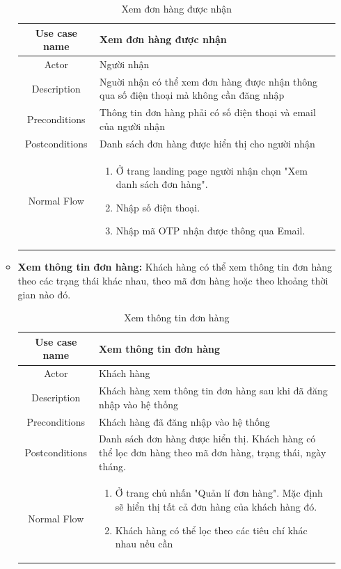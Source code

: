 \begin{itemize}
\begin{itemize}
			
			\begin{table}[H]
				\centering\begin{tabular}{|c|m{25em}|}
					\hline 
					Use case name & Xem đơn hàng được nhận\\ 
					\hline 
					Actor & Người nhận \\ 
					\hline
					Description & Nguời nhận có thể xem đơn hàng được nhận thông qua số điện thoại mà không cần đăng nhập \\
					\hline 
					Preconditions & Thông tin đơn hàng phải có số điện thoại và email của người nhận \\
					\hline
					Postconditions & Danh sách đơn hàng được hiển thị cho người nhận \\
					\hline
					Normal Flow & \begin{enumerate}
						\item Ở trang landing page người nhận chọn "Xem danh sách đơn hàng".
						\item Nhập số điện thoại.
						\item Nhập mã OTP nhận được thông qua Email.
					\end{enumerate}
					\\
					\hline
				\end{tabular}
				\caption{Xem đơn hàng được nhận}
			\end{table}
		
		
		\item \textbf{Xem thông tin đơn hàng:} Khách hàng có thể xem thông tin đơn hàng theo các trạng thái khác nhau, theo mã đơn hàng hoặc theo khoảng thời gian nào đó.
			
			\begin{table}[H]
				\centering\begin{tabular}{|c|m{25em}|}
					\hline 
					Use case name & Xem thông tin đơn hàng\\ 
					\hline 
					Actor & Khách hàng \\ 
					\hline
					Description & Khách hàng xem thông tin đơn hàng sau khi đã đăng nhập vào hệ thống \\
					\hline 
					Preconditions & Khách hàng đã đăng nhập vào hệ thống \\
					\hline
					Postconditions & Danh sách đơn hàng được hiển thị. Khách hàng có thể lọc đơn hàng theo mã đơn hàng, trạng thái, ngày tháng. \\
					\hline
					Normal Flow & \begin{enumerate}
						\item Ở trang chủ nhấn "Quản lí đơn hàng". Mặc định sẽ hiển thị tất cả đơn hàng của khách hàng đó.
						\item Khách hàng có thể lọc theo các tiêu chí khác nhau nếu cần
					\end{enumerate}
					\\
					\hline
				\end{tabular}
				\caption{Xem thông tin đơn hàng}
			\end{table}
			

\end{itemize}
\end{itemize}
